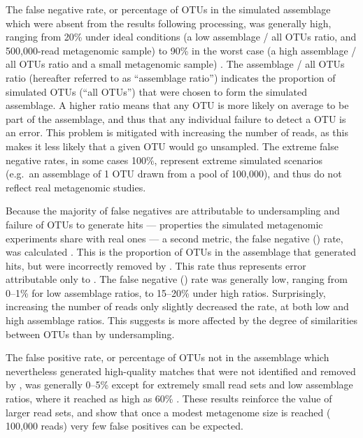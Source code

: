 The false negative rate, or percentage of \acp{OTU} in the simulated assemblage which were absent from the  results following  processing, was generally high, ranging from \textapprox{} 20\% under ideal conditions (a low assemblage / all \acp{OTU} ratio, and 500,000-read metagenomic sample) to \textapprox{} 90\% in the worst case (a high assemblage / all \acp{OTU} ratio and a small metagenomic sample) .
The assemblage / all \acp{OTU} ratio (hereafter referred to as ``assemblage ratio'') indicates the proportion of simulated \acp{OTU} (``all \acp{OTU}'') that were chosen to form the simulated assemblage.
A higher ratio means that any \ac{OTU} is more likely on average to be part of the assemblage, and thus that any individual failure to detect a \ac{OTU} is an error.
This problem is mitigated with increasing the number of reads, as this makes it less likely that a given \ac{OTU} would go unsampled.
The extreme false negative rates, in some cases 100\%, represent extreme simulated scenarios (e.g.\ an assemblage of 1 \ac{OTU} drawn from a pool of 100,000), and thus do not reflect real metagenomic studies.

Because the majority of false negatives are attributable to undersampling and failure of \acp{OTU} to generate  hits --- properties the simulated metagenomic experiments share with real ones --- a second metric, the false negative () rate, was calculated .
This is the proportion of \acp{OTU} in the assemblage that generated  hits, but were incorrectly removed by .
This rate thus represents error attributable only to .
The false negative () rate was generally low, ranging from \textapprox{} 0--1\% for low assemblage ratios, to \textapprox{} 15--20\% under high ratios.
Surprisingly, increasing the number of reads only slightly decreased the rate, at both low and high assemblage ratios.
This suggests  is more affected by the degree of similarities between \acp{OTU} than by undersampling.

The false positive rate, or percentage of \acp{OTU} not in the assemblage which nevertheless generated high-quality  matches that were not identified and removed by , was generally \textapprox{} 0--5\% except for extremely small read sets and low assemblage ratios, where it reached as high as 60\% .
These results reinforce the value of larger read sets, and show that once a modest metagenome size is reached (\textapprox{} 100,000 reads) very few false positives can be expected.

